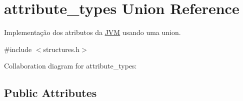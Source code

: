 \hypertarget{unionattribute__types}{}\section{attribute\+\_\+types Union Reference}
\label{unionattribute__types}


Implementação dos atributos da \hyperlink{structJVM}{J\+VM} usando uma union.  




{\ttfamily \#include $<$structures.\+h$>$}



Collaboration diagram for attribute\+\_\+types\+:
\subsection*{Public Attributes}

